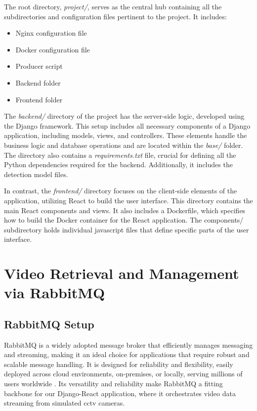 The root directory, \textit{project/}, serves as the central hub containing all the subdirectories and 
configuration files pertinent to the project. It includes:
\begin{itemize}
    \item Nginx configuration file
    \item Docker configuration file
    \item Producer script
    \item Backend folder
    \item Frontend folder
\end{itemize}

The \textit{backend/} directory of the project has the server-side logic, developed using the Django framework. 
This setup includes all necessary components of a Django application, including models, views, and 
controllers. These elements handle the business logic and database operations and are located within the \textit{base/} 
folder.
The directory also
contains a \textit{requirements.txt} file, 
crucial for defining all the Python dependencies required for the backend. Additionally, it includes the detection 
model files.

In contrast, the \textit{frontend/} directory focuses on the client-side elements of the application, utilizing React to 
build the user interface. This directory contains the main React components and views. It also includes a 
Dockerfile, which specifies how to build the
Docker container for the React application. 
The components/ subdirectory holds individual javascript files that define specific parts of the user interface.

\section{Video Retrieval and Management via RabbitMQ}
\subsection{RabbitMQ Setup}
RabbitMQ is a widely adopted message broker that efficiently manages messaging and streaming, making it an ideal 
choice for applications that require robust and scalable message handling. It is 
designed for reliability and flexibility, easily deployed across cloud environments, on-premises, or locally, serving 
millions of users worldwide \citet{rfc48}. Its versatility and reliability make RabbitMQ a fitting backbone for our Django-React 
application, where it orchestrates video data streaming from simulated \ac{cctv} cameras.

